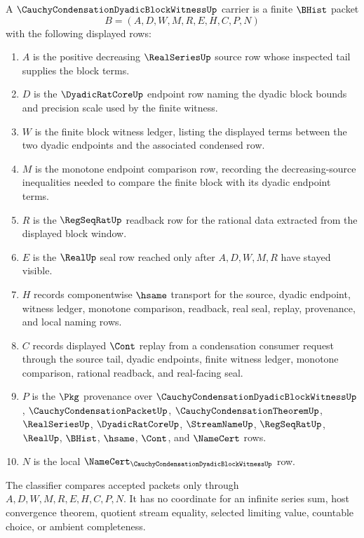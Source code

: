 \begin{definition}
\label{def:cauchy-condensation-dyadic-block-witness-carrier}
A $\CauchyCondensationDyadicBlockWitnessUp$ carrier is a finite $\BHist$ packet
$$
B=(A,D,W,M,R,E,H,C,P,N)
$$
with the following displayed rows:
\begin{enumerate}
\item $A$ is the positive decreasing $\RealSeriesUp$ source row whose inspected tail supplies the block terms.
\item $D$ is the $\DyadicRatCoreUp$ endpoint row naming the dyadic block bounds and precision scale used by the finite witness.
\item $W$ is the finite block witness ledger, listing the displayed terms between the two dyadic endpoints and the associated condensed row.
\item $M$ is the monotone endpoint comparison row, recording the decreasing-source inequalities needed to compare the finite block with its dyadic endpoint terms.
\item $R$ is the $\RegSeqRatUp$ readback row for the rational data extracted from the displayed block window.
\item $E$ is the $\RealUp$ seal row reached only after $A,D,W,M,R$ have stayed visible.
\item $H$ records componentwise $\hsame$ transport for the source, dyadic endpoint, witness ledger, monotone comparison, readback, real seal, replay, provenance, and local naming rows.
\item $C$ records displayed $\Cont$ replay from a condensation consumer request through the source tail, dyadic endpoints, finite witness ledger, monotone comparison, rational readback, and real-facing seal.
\item $P$ is the $\Pkg$ provenance over $\CauchyCondensationDyadicBlockWitnessUp$, $\CauchyCondensationPacketUp$, $\CauchyCondensationTheoremUp$, $\RealSeriesUp$, $\DyadicRatCoreUp$, $\StreamNameUp$, $\RegSeqRatUp$, $\RealUp$, $\BHist$, $\hsame$, $\Cont$, and $\NameCert$ rows.
\item $N$ is the local $\NameCert_{\CauchyCondensationDyadicBlockWitnessUp}$ row.
\end{enumerate}
The classifier compares accepted packets only through $A,D,W,M,R,E,H,C,P,N$. It has no coordinate for an infinite series sum, host convergence theorem, quotient stream equality, selected limiting value, countable choice, or ambient completeness.
\end{definition}

